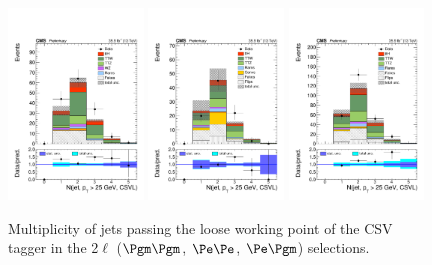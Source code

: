 \begin{figure}[htb]
	\centering 
\includegraphics[width=0.32\textwidth]{plots_leptons/lep_evtsel/2lss_SR/mm/nBJetLoose25.pdf}
\includegraphics[width=0.32\textwidth]{plots_leptons/lep_evtsel/2lss_SR/ee/nBJetLoose25.pdf}
\includegraphics[width=0.32\textwidth]{plots_leptons/lep_evtsel/2lss_SR/em/nBJetLoose25.pdf}
	\caption{Multiplicity of jets passing the loose working point of the CSV tagger in the 2$\ell$ ($\Pgm\Pgm$, $\Pe\Pe$, $\Pe\Pgm$) selections.}
	\label{fig:2l_nBJetLoose}
\end{figure}

